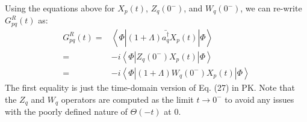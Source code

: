 \documentclass[aps,prb,preprint,groupaddress,floatfix]{revtex4}
\begin{document}
Using the equations above for $X_p(t)$, $Z_q(0^-)$, and $W_q(0^-)$, we can re-write $G^R_{pq}(t)$ as:
\begin{equation}
\label{eq:GZX}
\begin{split}
G^R_{pq}(t)=& \left< \Phi \left| (1+\Lambda)
              \bar{a^{\dagger}_q} X_p(t) \right| \Phi \right> \\
           =& -i \left< \Phi \left|
                Z_q(0^-) X_p(t) \right| \Phi \right> \\
           =& -i \left< \Phi \left| (1+\Lambda)
                W_q(0^-) X_p(t) \right| \Phi \right>
\end{split}
\end{equation}
The first equality is just the time-domain version of Eq. (27) in PK. Note that the $Z_q$ and $W_q$ operators are computed as the limit $ t\rightarrow 0^-$ to avoid any issues with the poorly defined nature of
$\Theta(-t)$ at 0.
\end{document}
